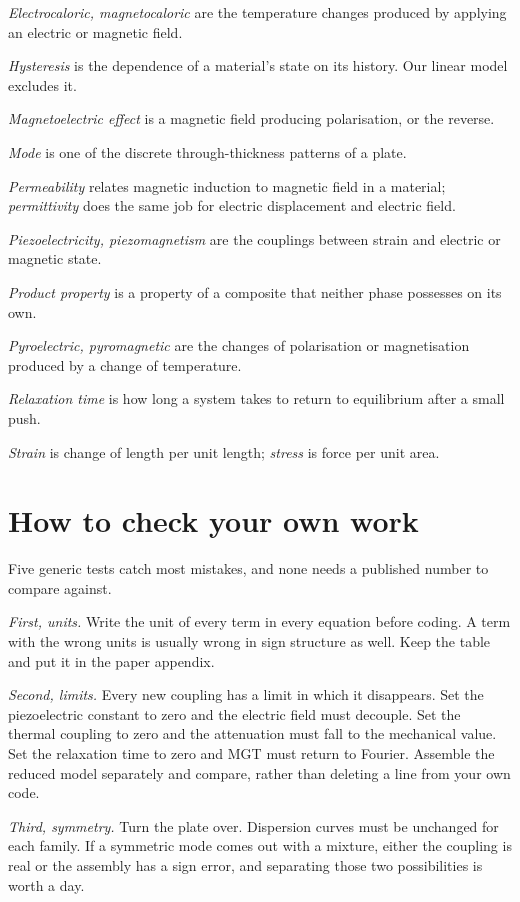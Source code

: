 \documentclass[11pt]{article}
\begin{document}
\textit{Electrocaloric, magnetocaloric} are the temperature changes produced by applying an electric or
magnetic field.

\textit{Hysteresis} is the dependence of a material's state on its history. Our linear model excludes it.

\textit{Magnetoelectric effect} is a magnetic field producing polarisation, or the reverse.

\textit{Mode} is one of the discrete through-thickness patterns of a plate.

\textit{Permeability} relates magnetic induction to magnetic field in a material; \textit{permittivity} does
the same job for electric displacement and electric field.

\textit{Piezoelectricity, piezomagnetism} are the couplings between strain and electric or magnetic state.

\textit{Product property} is a property of a composite that neither phase possesses on its own.

\textit{Pyroelectric, pyromagnetic} are the changes of polarisation or magnetisation produced by a change of
temperature.

\textit{Relaxation time} is how long a system takes to return to equilibrium after a small push.

\textit{Strain} is change of length per unit length; \textit{stress} is force per unit area.

\section{How to check your own work}

Five generic tests catch most mistakes, and none needs a published number to compare against.

\textit{First, units.} Write the unit of every term in every equation before coding. A term with the wrong
units is usually wrong in sign structure as well. Keep the table and put it in the paper appendix.

\textit{Second, limits.} Every new coupling has a limit in which it disappears. Set the piezoelectric constant
to zero and the electric field must decouple. Set the thermal coupling to zero and the attenuation must fall
to the mechanical value. Set the relaxation time to zero and MGT must return to Fourier. Assemble the reduced
model separately and compare, rather than deleting a line from your own code.

\textit{Third, symmetry.} Turn the plate over. Dispersion curves must be unchanged for each family. If a
symmetric mode comes out with a mixture, either the coupling is real or the assembly has a sign error, and
separating those two possibilities is worth a day.
\end{document}
